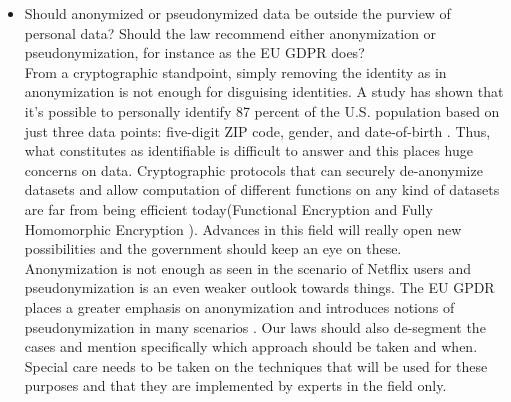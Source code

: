 \begin{itemize}
	\item Should anonymized or pseudonymized data be outside the purview of personal data? Should the law recommend either anonymization or pseudonymization, for instance as the EU GDPR does?
	\\
	From a cryptographic standpoint, simply removing the identity as in anonymization is not enough for disguising identities. A study has shown that it’s possible to personally identify 87 percent of the U.S. population based on just three data points: five-digit ZIP code, gender, and date-of-birth \cite{zipcodeid}. Thus, what constitutes as identifiable is difficult to answer and this places huge concerns on data. Cryptographic protocols that can securely de-anonymize datasets and allow computation of different functions on any kind of datasets are far from being efficient today(Functional Encryption \cite{bsw11} and Fully Homomorphic Encryption \cite{gen09}).
	Advances in this field will really open new possibilities and the government should keep an eye on these.
	\\
	Anonymization is not enough as seen in the scenario of Netflix users \cite{netflix} and pseudonymization is an even weaker outlook towards things. The EU GPDR places a greater emphasis on anonymization and introduces notions of pseudonymization in many scenarios \cite{anonpseudo}. Our laws should also de-segment the cases and mention specifically which approach should be taken and when. Special care needs to be taken on the techniques that will be used for these purposes and that they are implemented by experts in the field only.
\end{itemize}
